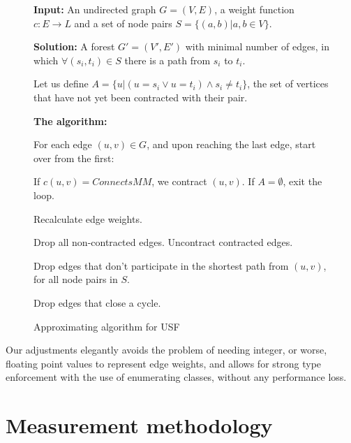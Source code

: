 \documentclass{article}
\begin{document}
\begin{figure}
  \textbf{Input:} An undirected graph $G = (V, E)$, a weight function $c : E \rightarrow L$ and a set of node pairs $S = \{(a, b) | a, b \in V \}$.

  \textbf{Solution:} A forest $G' = (V', E')$ with minimal number of edges, in which $\forall (s_i, t_i) \in S$ there is a path from $s_i$ to $t_i$.
  \vspace{1em}

  Let us define $A = \{u | (u=s_i \vee u = t_i) \wedge s_i \neq t_i\}$, the set of vertices that have not yet been contracted with
  their pair.
  \vspace{1em}

  \textbf{The algorithm:}
  \begin{compactenum}
  \item For each edge $(u,v) \in G$, and upon reaching the last edge, start over from the first:
    \begin{compactenum}
      \item If $c(u,v) = ConnectsMM$, we contract $(u,v)$. If $A = \emptyset$, exit the loop.
      \item Recalculate edge weights.
    \end{compactenum}
  \item Drop all non-contracted edges. Uncontract contracted edges.
  \item Drop edges that don't participate in the shortest path from $(u, v)$, for all node pairs in $S$.
  \item Drop edges that close a cycle.
  \end{compactenum}
  
  \caption{Approximating algorithm for USF}
  \label{fig:usf-algorithm}
\end{figure}

Our adjustments elegantly avoids the problem of needing integer, or worse, floating point values to represent edge weights, and allows for strong type enforcement with the use of enumerating classes, without any performance loss.
\section{Measurement methodology}
\label{sec:method}
\end{document}
